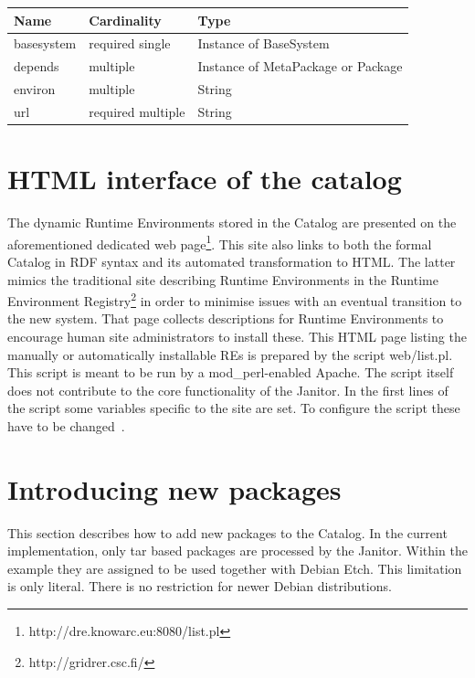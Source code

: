 \begin{table}[!h]
   \begin{center}
         \label{tab:main_class_tar}
	\begin{tabular}{p{3cm}p{3cm}p{6cm}}
	\textbf{Name} & \textbf{Cardinality} & \textbf{Type}\\
	\hline
	basesystem    & required single      & Instance of BaseSystem \\
	depends       & multiple             & Instance of MetaPackage or Package \\
	environ       & multiple             & String \\
	url           & required multiple    & String \\
	\end{tabular} 
   \end{center}
\end{table}

\section{HTML interface of the catalog}

The dynamic Runtime Environments stored in the
Catalog are presented on the aforementioned dedicated web
page\footnote{http://dre.knowarc.eu:8080/list.pl}. This site also
links to both the formal Catalog in RDF syntax and its automated
transformation to HTML.  The latter mimics the traditional
site describing Runtime Environments in the Runtime Environment
Registry\footnote{http://gridrer.csc.fi/} in order to minimise issues with
an eventual transition to the new system.  That page collects descriptions
for Runtime Environments to encourage human site administrators to
install these.  This HTML page listing the manually or automatically
installable REs is prepared by the script web/list.pl.  This script is
meant to be run by a mod\_perl-enabled Apache. The script itself does
not contribute to the core functionality of the Janitor.  In the first
lines of the script some variables specific to the site are set. To
configure the script these have to be changed~\cite[p. 9]{BAYER_2007}.


\section{Introducing new packages}\label{sec:catalog}

This section describes how to add new packages to the Catalog. In the
current implementation, only tar based packages are processed by the
Janitor.  Within the example they are assigned to be used together with
Debian Etch. This limitation is only literal.  There is no restriction
for newer Debian distributions.

